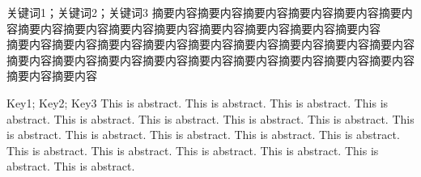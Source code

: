 
\begin{cnabstract}{关键词1；关键词2；关键词3}
   摘要内容摘要内容摘要内容摘要内容摘要内容摘要内容摘要内容摘要内容摘要内容摘要内容摘要内容摘要内容摘要内容摘要内容\\
  摘要内容摘要内容摘要内容摘要内容摘要内容摘要内容摘要内容摘要内容摘要内容摘要内容摘要内容摘要内容摘要内容摘要内容摘要内容摘要内容摘要内容摘要内容摘要内容摘要内容
\end{cnabstract}


\begin{enabstract}{Key1; Key2; Key3}
    This is abstract. This is abstract. This is abstract. This is abstract. This is abstract. This is abstract. This is abstract. This is abstract.
  This is abstract. This is abstract. This is abstract. This is abstract. This is abstract. This is abstract. This is abstract. This is abstract. This is abstract. This is abstract. This is abstract. 
\end{enabstract}

